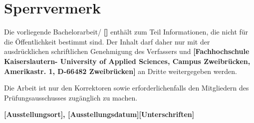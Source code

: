 \chapter*{Sperrvermerk}
Die vorliegende Bachelorarbeit/
\textbf{[\bachelorarbeittitelDE]}
enth\"alt zum Teil Informationen, die nicht f\"ur die \"Offentlichkeit bestimmt
sind.
Der Inhalt darf daher nur mit der ausdr\"ucklichen schriftlichen Genehmigung
des Verfassers und \textbf{[Fachhochschule Kaiserslautern- University of Applied Sciences,
Campus Zweibr\"ucken, Amerikastr. 1, D-66482 Zweibr\"ucken]} an Dritte weitergegeben werden.

Die Arbeit ist nur den Korrektoren sowie erforderlichenfalls den Mitgliedern des
Pr\"ufungsausschusses zug\"anglich zu machen.
\vspace*{3cm}

\textbf{[Ausstellungsort], [Ausstellungsdatum]}\hfill\textbf{[Unterschriften]}